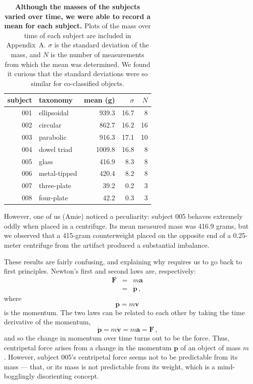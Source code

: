 \documentclass[10pt]{article}
\theoremstyle{definition}
\begin{document}
\begin{table}
\begin{tabular}{rlrrr}%
subject & taxonomy & mean (g) & $\sigma$ & $N$ \\
\hline
001 & ellipsoidal & 939.3 & 16.7 & 8 \\
002 & circular & 862.7 & 16.2 & 16 \\
003 & parabolic & 916.3 & 17.1 & 10 \\
004 & dowel triad & 1009.8 & 16.8 & 8 \\
005 & glass & 416.9 & 8.3 & 8 \\
006 & metal-tipped & 420.4 & 8.2 & 8 \\
007 & three-plate & 39.2 & 0.2 & 3 \\
008 & four-plate & 42.2 & 0.3 & 3 \\
\hline
\end{tabular}
\caption{\label{tab:mass}\textbf{Although the masses of the subjects varied over time, we were able to record a mean for each subject.} Plots of the mass over time of each subject are included in Appendix~A. $\sigma$ is the standard deviation of the mass, and $N$ is the number of measurements from which the mean was determined. We found it curious that the standard deviations were so similar for co-classified objects.}
\end{table}

However, one of us (Amie) noticed a peculiarity: subject 005 behaves extremely oddly when placed in a centrifuge.
Its mean measured mass was 416.9 grams, but we observed that a 415-gram counterweight placed on the opposite end of a 0.25-meter centrifuge from the artifact produced a substantial imbalance.

These results are fairly confusing, and explaining why requires us to go back to first principles.
Newton's first and second laws are, respectively:
%
\begin{eqnarray}
\mathbf{F} &=& m \mathbf{a} \\
 &=& \dot{\mathbf{p}}\,\textrm{,}
\end{eqnarray}
%
where
%
\begin{equation}
\mathbf{p} = m \mathbf{v}
\end{equation}
%
is the momentum.
%
The two laws can be related to each other by taking the time derivative of the momentum,
%
\begin{equation}
\dot{\mathbf{p}} = m \dot{\mathbf{v}} = m \mathbf{a} = \mathbf{F}\,\textrm{,}
\end{equation}
%
and so the change in momentum over time turns out to be the force.
Thus, centripetal force arises from a change in the momentum $\mathbf{p}$ of an object of mass $m$.
However, subject 005's centripetal force seems not to be predictable from its mass --- that, or its mass is not predictable from its weight, which is a mind-bogglingly disorienting concept.
\end{document}
